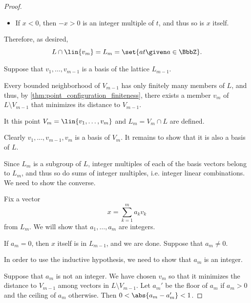 \begin{proof}
\begin{itemize}
    Therefore, \( x \) is necessarily an integer multiple of \( t \).

    \item If \( x < 0 \), then \( -x > 0 \) is an integer multiple of \( t \), and thus so is \( x \) itself.
  \end{itemize}

  Therefore, as desired,
  \begin{equation*}
    L \cap \lin{ v_m } = L_m = \set{ at \given a \in \BbbZ }.
  \end{equation*}

   Suppose that \( v_1, \ldots, v_{m-1} \) is a basis of the lattice \( L_{m-1} \).

  Every bounded neighborhood of \( V_{m-1} \) has only finitely many members of \( L \), and thus, by \cref{thm:point_configuration_finiteness}, there exists a member \( v_m \) of \( L \setminus V_{m-1} \) that minimizes its distance to \( V_{m-1} \).

  It this point \( V_m = \lin{ v_1, \ldots, v_m } \) and \( L_m = V_m \cap L \) are defined.

  Clearly \( v_1, \ldots, v_{m-1}, v_m \) is a basis of \( V_m \). It remains to show that it is also a basis of \( L \).

  Since \( L_m \) is a subgroup of \( L \), integer multiples of each of the basis vectors belong to \( L_m \), and thus so do sums of integer multiples, i.e. integer linear combinations. We need to show the converse.

  Fix a vector
  \begin{equation*}
    x = \sum_{k=1}^m a_k v_k
  \end{equation*}
  from \( L_m \). We will show that \( a_1, \ldots, a_m \) are integers.

  If \( a_m = 0 \), then \( x \) itself is in \( L_{m-1} \), and we are done. Suppose that \( a_m \neq 0 \).

  In order to use the inductive hypothesis, we need to show that \( a_m \) is an integer.

  Suppose that \( a_m \) is not an integer. We have chosen \( v_m \) so that it minimizes the distance to \( V_{m-1} \) among vectors in \( L \setminus V_{m-1} \). Let \( a_m' \) be the floor of \( a_m \) if \( a_m > 0 \) and the ceiling of \( a_m \) otherwise. Then \( 0 < \abs{a_m - a_m'} < 1 \).


\end{proof}
